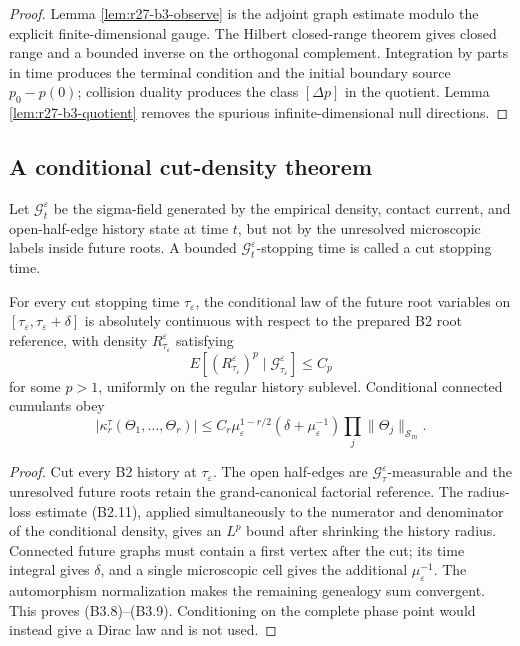 \begin{proof}
Lemma \ref{lem:r27-b3-observe} is the adjoint graph estimate modulo the
explicit finite-dimensional gauge.  The Hilbert closed-range theorem gives
closed range and a bounded inverse on the orthogonal complement.  Integration
by parts in time produces the terminal condition and the initial boundary
source $p_0-p(0)$; collision duality produces the class $[\Delta p]$ in the
quotient.  Lemma \ref{lem:r27-b3-quotient} removes the spurious
infinite-dimensional null directions.
\end{proof}

\subsection{A conditional cut-density theorem}

Let $\mathcal G_t^\varepsilon$ be the sigma-field generated by the empirical
density, contact current, and open-half-edge history state at time $t$, but not
by the unresolved microscopic labels inside future roots.  A bounded
$\mathcal G_t^\varepsilon$-stopping time is called a cut stopping time.

\begin{lemma}
\label{lem:r27-b3-cut}
For every cut stopping time $\tau_\varepsilon$, the conditional law of the
future root variables on $[\tau_\varepsilon,\tau_\varepsilon+\delta]$ is
absolutely continuous with respect to the prepared B2 root reference, with
density $R_{\tau_\varepsilon}^\varepsilon$ satisfying
\[
 E\!\left[(R_{\tau_\varepsilon}^\varepsilon)^p
 \mid\mathcal G_{\tau_\varepsilon}^\varepsilon\right]\le C_p            \tag{B3.8}
\]
for some $p>1$, uniformly on the regular history sublevel.  Conditional
connected cumulants obey
\[
 |\kappa_r^\tau(\Theta_1,\ldots,\Theta_r)|
 \le C_r\mu_\varepsilon^{1-r/2}
       (\delta+\mu_\varepsilon^{-1})\prod_j\|\Theta_j\|_{\mathcal S_m}.
                                                                    \tag{B3.9}
\]
\end{lemma}

\begin{proof}
Cut every B2 history at $\tau_\varepsilon$.  The open half-edges are
$\mathcal G_\tau^\varepsilon$-measurable and the unresolved future roots retain
the grand-canonical factorial reference.  The radius-loss estimate
(B2.11), applied simultaneously to the numerator and denominator of the
conditional density, gives an $L^p$ bound after shrinking the history radius.
Connected future graphs must contain a first vertex after the cut; its time
integral gives $\delta$, and a single microscopic cell gives the additional
$\mu_\varepsilon^{-1}$.  The automorphism normalization makes the remaining
genealogy sum convergent.  This proves (B3.8)--(B3.9).  Conditioning on the
complete phase point would instead give a Dirac law and is not used.
\end{proof}

